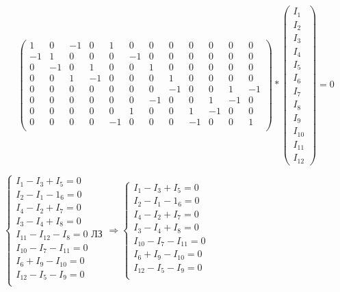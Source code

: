 \begin{enumerate}
   $$\left( \begin{array}{*{12}{c}}
   1 & 0 & -1 & 0 & 1 & 0 & 0 & 0 & 0 & 0 & 0 & 0 \\
   -1 & 1 & 0 & 0 & 0 & -1 & 0 & 0 & 0 & 0 & 0 & 0 \\
   0 & -1 & 0 & 1 & 0 & 0 & 1 & 0 & 0 & 0 & 0 & 0 \\
   0 & 0 & 1 & -1 & 0 & 0 & 0 & 1 & 0 & 0 & 0 & 0 \\
   0 & 0 & 0 & 0 & 0 & 0 & 0 & -1 & 0 & 0 & 1 & -1 \\
   0 & 0 & 0 & 0 & 0 & 0 & -1 & 0 & 0 & 1 & -1 & 0 \\
   0 & 0 & 0 & 0 & 0 & 1 & 0 & 0 & 1 & -1 & 0 & 0 \\
   0 & 0 & 0 & 0 & -1 & 0 & 0 & 0 & -1 & 0 & 0 & 1 \\
   \end{array} \right)*\begin{pmatrix}I_1 \\ I_2 \\ I_3 \\ I_4 \\ I_5 \\ I_6 \\ I_7 \\ I_8 \\ I_9 \\ I_{10} \\ I_{11} \\ I_{12}\end{pmatrix} = 0$$

   $\left\{
      \begin{array}{l}
        I_1-I_3+I_5=0\\
        I_2-I_1-1_6=0\\
        I_4-I_2+I_7=0\\
        I_3-I_4+I_8=0\\
        I_{11}-I_{12}-I_8=0 \text{ ЛЗ}\\
        I_{10}-I_7-I_{11}=0\\
        I_6+I_9-I_{10}=0 \\
        I_{12}-I_5-I_9=0 \\
      \end{array}
    \right. \Longrightarrow
    \left\{
      \begin{array}{l}
        I_1-I_3+I_5=0\\
        I_2-I_1-1_6=0\\
        I_4-I_2+I_7=0\\
        I_3-I_4+I_8=0\\
        I_{10}-I_7-I_{11}=0\\
        I_6+I_9-I_{10}=0 \\
        I_{12}-I_5-I_9=0 \\
      \end{array}
    \right.$


\end{enumerate}
